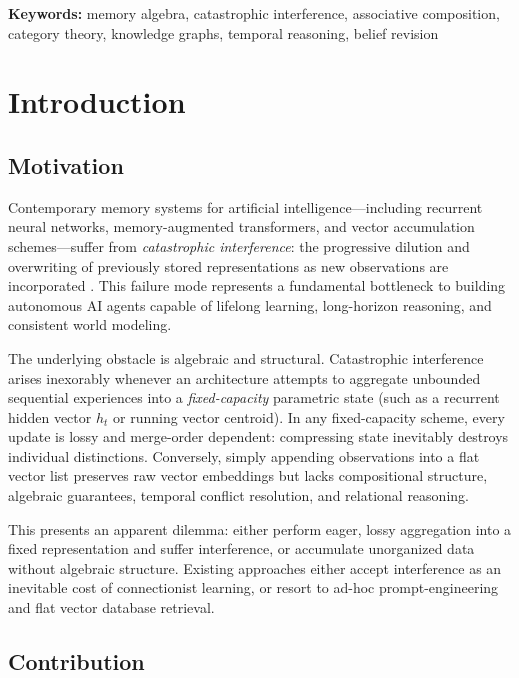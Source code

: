 \documentclass[11pt,a4paper]{article}
\theoremstyle{definition}
\begin{document}
\textbf{Keywords:} memory algebra, catastrophic interference, associative composition, category theory, knowledge graphs, temporal reasoning, belief revision

\section{Introduction}

\subsection{Motivation}

Contemporary memory systems for artificial intelligence---including recurrent neural networks, memory-augmented transformers, and vector accumulation schemes---suffer from \emph{catastrophic interference}: the progressive dilution and overwriting of previously stored representations as new observations are incorporated \cite{mccloskey1989catastrophic,french1999catastrophic}. This failure mode represents a fundamental bottleneck to building autonomous AI agents capable of lifelong learning, long-horizon reasoning, and consistent world modeling.

The underlying obstacle is algebraic and structural. Catastrophic interference arises inexorably whenever an architecture attempts to aggregate unbounded sequential experiences into a \emph{fixed-capacity} parametric state (such as a recurrent hidden vector $h_t$ or running vector centroid). In any fixed-capacity scheme, every update is lossy and merge-order dependent: compressing state inevitably destroys individual distinctions. Conversely, simply appending observations into a flat vector list preserves raw vector embeddings but lacks compositional structure, algebraic guarantees, temporal conflict resolution, and relational reasoning.

This presents an apparent dilemma: either perform eager, lossy aggregation into a fixed representation and suffer interference, or accumulate unorganized data without algebraic structure. Existing approaches either accept interference as an inevitable cost of connectionist learning, or resort to ad-hoc prompt-engineering and flat vector database retrieval.

\subsection{Contribution}
\end{document}
